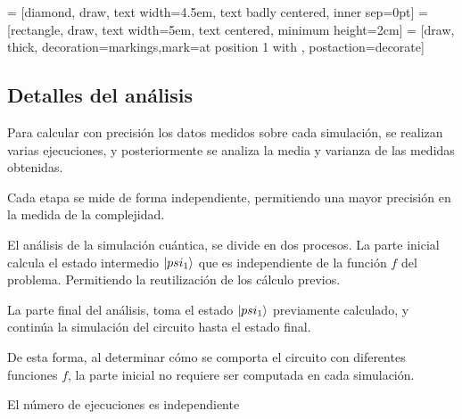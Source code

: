 %
\begin{center}
 = [diamond, draw, text width=4.5em, text badly centered, 
inner sep=0pt]
 = [rectangle, draw, text width=5em, text centered, minimum 
height=2cm]
 = [draw, thick, decoration={markings,mark=at position 
1 with {}}, postaction={decorate}]
%
\end{center}
%

\subsection{Detalles del análisis}
Para calcular con precisión los datos medidos sobre cada simulación, se realizan 
varias ejecuciones, y posteriormente se analiza la media y varianza de las 
medidas obtenidas.

Cada etapa se mide de forma independiente, permitiendo una mayor precisión en la 
medida de la complejidad.

El análisis de la simulación cuántica, se divide en dos procesos. La parte 
inicial calcula el estado intermedio $\ket{psi_1}$ que es independiente de la 
función $f$ del problema. Permitiendo la reutilización de los cálculo previos.

La parte final del análisis, toma el estado $\ket{psi_1}$ previamente calculado, 
y continúa la simulación del circuito hasta el estado final.

De esta forma, al determinar cómo se comporta el circuito con diferentes 
funciones $f$, la parte inicial no requiere ser computada en cada simulación.

El número de ejecuciones es independiente


